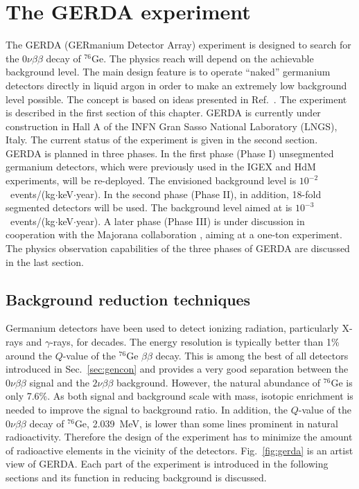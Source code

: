 \chapter{The GERDA experiment}
\label{cha:gerda}
The GERDA (GERmanium Detector Array) experiment \cite{Abt04, Sch05} is designed to search for the $0\nu\beta\beta$ decay of $^{76}$Ge. The physics reach will depend on the achievable background level. The main design feature is to operate ``naked'' germanium detectors directly in liquid argon in order to make an extremely low background level possible. The concept is based on ideas presented in Ref.~\cite{Heu95}. The experiment is described in the first section of this chapter. GERDA is currently under construction in Hall A of the INFN Gran Sasso National Laboratory (LNGS), Italy. The current status of the experiment is given in the second section. GERDA is planned in three phases. In the first phase (Phase I) unsegmented germanium detectors, which were previously used in the IGEX \cite{Aal02} and HdM \cite{Hei04} experiments, will be re-deployed. The envisioned background level is $10^{-2}$~events/(kg$\cdot$keV$\cdot$year). In the second phase (Phase II), in addition, 18-fold segmented detectors will be used. The background level aimed at is $10^{-3}$~events/(kg$\cdot$keV$\cdot$year). A later phase (Phase III) is under discussion in cooperation with the Majorana collaboration \cite{Gai03,Aal04}, aiming at a one-ton experiment. The physics observation capabilities of the three phases of GERDA are discussed in the last section.

\section{Background reduction techniques}
\label{sec:gerda:conc}
Germanium detectors have been used to detect ionizing radiation, particularly X-rays and $\gamma$-rays, for decades. The energy resolution is typically better than 1\% around the $Q$-value of the $^{76}$Ge $\beta\beta$ decay. This is among the best of all detectors introduced in Sec.~\ref{sec:gencon} and provides a very good separation between the $0\nu\beta\beta$ signal and the $2\nu\beta\beta$ background. However, the natural abundance of $^{76}$Ge is only 7.6\%. As both signal and background scale with mass, isotopic enrichment is needed to improve the signal to background ratio. In addition, the $Q$-value of the $0\nu\beta\beta$ decay of $^{76}$Ge, 2.039~MeV, is lower than some lines prominent in natural radioactivity. Therefore the design of the experiment has to minimize the amount of radioactive elements in the vicinity of the detectors. Fig.~\ref{fig:gerda} is an artist view of GERDA. Each part of the experiment is introduced in the following sections and its function in reducing background is discussed.

